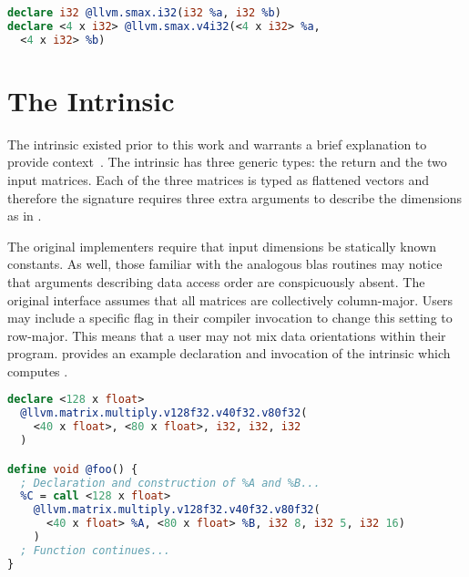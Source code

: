 \documentclass[\main/thesis.tex]{subfiles}
\begin{document}
\begin{lstlisting}[caption={[Example Inrinsic Declarations]A set of basic intrinsic declarations~\autocite{llvmLangref}.},
      label=lst:intrinsics,numbers=none,language=llvm,float]
declare i32 @llvm.smax.i32(i32 %a, i32 %b)
declare <4 x i32> @llvm.smax.v4i32(<4 x i32> %a,
  <4 x i32> %b)
\end{lstlisting}

\section{The \texorpdfstring{}{llvm.matrix.multiply.*} Intrinsic}
\label{sec:matMulInt}
The  \gls{intrinsic} existed prior to this work and warrants a brief explanation to provide context~\autocite{llvmLangref}.
The \gls{intrinsic} has three generic types: the return and the two input matrices.
Each of the three matrices is typed as flattened vectors and therefore the signature requires three extra arguments to describe the dimensions as in .

The original implementers require that input dimensions be statically known constants.
As well, those familiar with the analogous \gls{blas} routines may notice that arguments describing data access order are conspicuously absent.
The original interface assumes that all matrices are collectively column-major.
Users may include a specific flag in their compiler invocation to change this setting to row-major.
This means that a user may not mix data orientations within their program.
 provides an example declaration and invocation of the intrinsic which computes .

\begin{lstlisting}[caption={[Example Declaration and Use of \code{llvm.matrix.multiply.*}]An example declaration and usage of the \code{llvm.matrix.multiply.*} intrinsic.},
      label=lst:matMulIntr,language=llvm,basicstyle=\footnotesize,float]
declare <128 x float>
  @llvm.matrix.multiply.v128f32.v40f32.v80f32(
    <40 x float>, <80 x float>, i32, i32, i32
  )

define void @foo() {
  ; Declaration and construction of %A and %B...
  %C = call <128 x float>
    @llvm.matrix.multiply.v128f32.v40f32.v80f32(
      <40 x float> %A, <80 x float> %B, i32 8, i32 5, i32 16)
    )
  ; Function continues...
}
\end{lstlisting}
\end{document}
